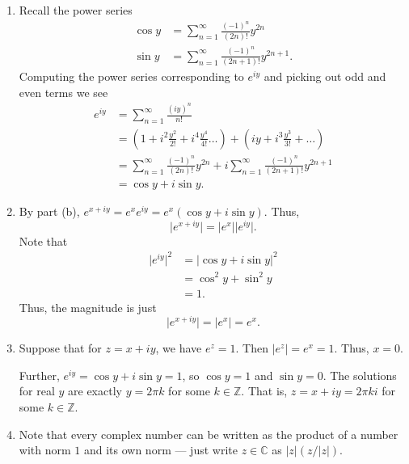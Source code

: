 \documentclass[12 pt, letterpaper]{hmcpset}
\begin{document}
\begin{solution}
\begin{enumerate}
			This means that we have
			\[
				\sum_{n = 0}^{N} \frac{(z_{1} + z_{2})^{n}}{n!} \le \left ( \sum_{n = 0}^{N} \frac{z_{1}^{n}}{n!} \right ) \left ( \sum_{n = 0}^{N} \frac{z_{2}^{n}}{n!} \right ) \le \sum_{n = 0}^{2N} \frac{(z_{1} + z_{2})^{n}}{n!}
			\]
			Taking limits as $N \to \infty$ we get that the two series are equal (choose $N$ large enough that the difference between the $N$th and $2N$th partial sums is less than $\varepsilon$, the same inequality applies to the difference between the partial sums of $e^{z_{1}} e^{z_{2}}$ and $e^{z_{1} + z_{2}}$).
		\item Recall the power series
			\begin{align*}
				\cos{y} & = \sum_{n = 1}^{\infty} \frac{(-1)^{n}}{(2n)!} y^{2n} \\
				\sin{y}	& = \sum_{n = 1}^{\infty} \frac{(-1)^{n}}{(2n + 1)!} y^{2n + 1}.
			\end{align*}
			Computing the power series corresponding to $e^{iy}$ and picking out odd and even terms we see
			\begin{align*}
				e^{iy} & = \sum_{n = 1}^{\infty} \frac{(iy)^{n}}{n!} \\
				       & = \left ( 1 + i^{2} \frac{y^{2}}{2!} + i^{4} \frac{y^{4}}{4!} \dots \right ) + \left ( i y + i^{3} \frac{y^{3}}{3!} + \dots \right ) \\
				       & = \sum_{n = 1}^{\infty} \frac{(-1)^{n}}{(2n)!} y^{2n} + i \sum_{n = 1}^{\infty} \frac{(-1)^{n}}{(2n + 1)!} y^{2n + 1} \\
				       & = \cos{y} + i \sin{y}.
			\end{align*}
		\item By part (b), $e^{x + iy} = e^{x} e^{iy} = e^{x}(\cos{y} + i \sin{y})$. Thus,
			\[
				\lvert e^{x + i y} \rvert = \lvert e^{x} \rvert \lvert e^{iy} \rvert.
			\]
			Note that
			\begin{align*}
				\lvert e^{iy} \rvert^{2} & = \lvert \cos{y} + i \sin{y} \rvert^{2} \\
							 & = \cos^{2}{y} + \sin^{2}{y} \\
							 & = 1.
			\end{align*}
			Thus, the magnitude is just
			\[
				\lvert e^{x + iy} \rvert = \lvert e^{x} \rvert = e^{x}.
			\]
		\item Suppose that for $z = x + i y$, we have $e^{z} = 1$. Then $\lvert e^{z} \rvert = e^{x} = 1$. Thus, $x = 0$.

			Further, $e^{iy} = \cos{y} + i \sin{y} = 1$, so $\cos{y} = 1$ and $\sin{y} = 0$. The solutions for real $y$ are exactly $y = 2 \pi k$ for some $k \in \mathbb{Z}$. That is, $z = x + i y = 2 \pi k i$ for some $k \in \mathbb{Z}$.
		\item Note that every complex number can be written as the product of a number with norm $1$ and its own norm --- just write $z \in \mathbb{C}$ as $\lvert z \rvert (z / \lvert z \rvert)$. 


\end{enumerate}
\end{solution}
\end{document}
